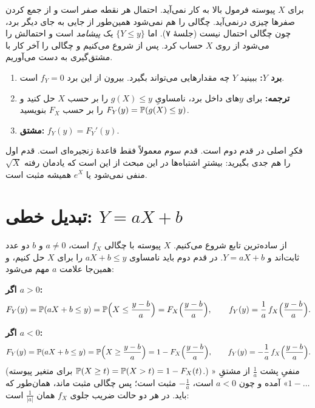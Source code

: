 برای $X$ پیوسته فرمول بالا به کار نمی‌آید. احتمال هر نقطه صفر است و از جمع کردن صفرها چیزی درنمی‌آید. چگالی را هم نمی‌شود همین‌طور از جایی به جای دیگر برد، چون چگالی احتمال نیست (جلسهٔ ۷). اما $\{Y\le y\}$ یک \emph{پیشامد} است و احتمالش را می‌شود از روی $X$ حساب کرد. پس از  شروع می‌کنیم و چگالی را آخر کار با مشتق‌گیری به دست می‌آوریم.

\begin{keyformula}
\begin{enumerate}[leftmargin=1.4em, itemsep=4pt]
  \item \textbf{برد $Y$:} ببینید $Y$ چه مقدارهایی می‌تواند بگیرد. بیرون از این برد $f_Y=0$ است.
  \item \textbf{ترجمه:} برای $y$های داخل برد، نامساویِ $g(X)\le y$ را بر حسب $X$ حل کنید و $F_Y(y)=\P(g(X)\le y)$ را بر حسب $F_X$ بنویسید.
  \item \textbf{مشتق:} $f_Y(y)=F_Y'(y)$.
\end{enumerate}
\end{keyformula}

فکرِ اصلی در قدم دوم است. قدم سوم معمولاً فقط قاعدهٔ زنجیره‌ای است. قدم اول را هم جدی بگیرید: بیشترِ اشتباه‌ها در این مبحث از این است که یادمان رفته $\sqrt X$ منفی نمی‌شود یا $e^X$ همیشه مثبت است.

\section{تبدیل خطی: $Y=aX+b$}
\label{sec:linear}

از ساده‌ترین تابع شروع می‌کنیم. $X$ پیوسته با چگالی $f_X$ است، $a\ne0$ و $b$ دو عدد ثابت‌اند و $Y=aX+b$. در قدم دوم باید نامساوی $aX+b\le y$ را برای $X$ حل کنیم، و همین‌جا علامت $a$ مهم می‌شود: 

\textbf{اگر $a>0$:}
\[ F_Y(y)=\P(aX+b\le y)=\P\Bigl(X\le\frac{y-b}{a}\Bigr)=F_X\Bigl(\frac{y-b}{a}\Bigr),\qquad f_Y(y)=\frac1a\,f_X\Bigl(\frac{y-b}{a}\Bigr). \]

\textbf{اگر $a<0$:}
\[ F_Y(y)=\P(aX+b\le y)=\P\Bigl(X\ge\frac{y-b}{a}\Bigr)=1-F_X\Bigl(\frac{y-b}{a}\Bigr),\qquad f_Y(y)=-\frac1a\,f_X\Bigl(\frac{y-b}{a}\Bigr). \]
(برای متغیر پیوسته $\P(X\ge t)=\P(X>t)=1-F_X(t)$.) منفیِ پشت $\frac1a$ از مشتقِ «$1-\dots$» آمده و چون $a<0$ است، $-\frac1a$ مثبت است؛ پس چگالی مثبت ماند، همان‌طور که باید. در هر دو حالت ضریب جلوی $f_X$ همان $\frac1{|a|}$ است:

